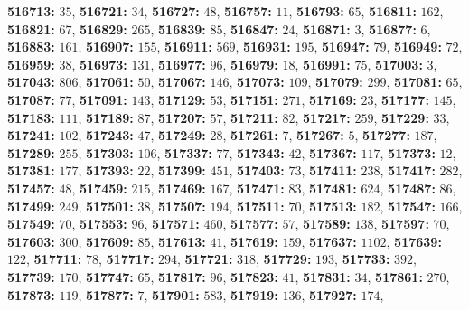 \textsf{\bfseries 516713:} $35$, \textsf{\bfseries 516721:} $34$, \textsf{\bfseries 516727:} $48$, \textsf{\bfseries 516757:} $11$, \textsf{\bfseries 516793:} $65$, \textsf{\bfseries 516811:} $162$, \textsf{\bfseries 516821:} $67$, \textsf{\bfseries 516829:} $265$, \textsf{\bfseries 516839:} $85$, \textsf{\bfseries 516847:} $24$, \textsf{\bfseries 516871:} $3$, \textsf{\bfseries 516877:} $6$, \textsf{\bfseries 516883:} $161$, \textsf{\bfseries 516907:} $155$, \textsf{\bfseries 516911:} $569$, \textsf{\bfseries 516931:} $195$, \textsf{\bfseries 516947:} $79$, \textsf{\bfseries 516949:} $72$, \textsf{\bfseries 516959:} $38$, \textsf{\bfseries 516973:} $131$, \textsf{\bfseries 516977:} $96$, \textsf{\bfseries 516979:} $18$, \textsf{\bfseries 516991:} $75$, \textsf{\bfseries 517003:} $3$, \textsf{\bfseries 517043:} $806$, \textsf{\bfseries 517061:} $50$, \textsf{\bfseries 517067:} $146$, \textsf{\bfseries 517073:} $109$, \textsf{\bfseries 517079:} $299$, \textsf{\bfseries 517081:} $65$, \textsf{\bfseries 517087:} $77$, \textsf{\bfseries 517091:} $143$, \textsf{\bfseries 517129:} $53$, \textsf{\bfseries 517151:} $271$, \textsf{\bfseries 517169:} $23$, \textsf{\bfseries 517177:} $145$, \textsf{\bfseries 517183:} $111$, \textsf{\bfseries 517189:} $87$, \textsf{\bfseries 517207:} $57$, \textsf{\bfseries 517211:} $82$, \textsf{\bfseries 517217:} $259$, \textsf{\bfseries 517229:} $33$, \textsf{\bfseries 517241:} $102$, \textsf{\bfseries 517243:} $47$, \textsf{\bfseries 517249:} $28$, \textsf{\bfseries 517261:} $7$, \textsf{\bfseries 517267:} $5$, \textsf{\bfseries 517277:} $187$, \textsf{\bfseries 517289:} $255$, \textsf{\bfseries 517303:} $106$, \textsf{\bfseries 517337:} $77$, \textsf{\bfseries 517343:} $42$, \textsf{\bfseries 517367:} $117$, \textsf{\bfseries 517373:} $12$, \textsf{\bfseries 517381:} $177$, \textsf{\bfseries 517393:} $22$, \textsf{\bfseries 517399:} $451$, \textsf{\bfseries 517403:} $73$, \textsf{\bfseries 517411:} $238$, \textsf{\bfseries 517417:} $282$, \textsf{\bfseries 517457:} $48$, \textsf{\bfseries 517459:} $215$, \textsf{\bfseries 517469:} $167$, \textsf{\bfseries 517471:} $83$, \textsf{\bfseries 517481:} $624$, \textsf{\bfseries 517487:} $86$, \textsf{\bfseries 517499:} $249$, \textsf{\bfseries 517501:} $38$, \textsf{\bfseries 517507:} $194$, \textsf{\bfseries 517511:} $70$, \textsf{\bfseries 517513:} $182$, \textsf{\bfseries 517547:} $166$, \textsf{\bfseries 517549:} $70$, \textsf{\bfseries 517553:} $96$, \textsf{\bfseries 517571:} $460$, \textsf{\bfseries 517577:} $57$, \textsf{\bfseries 517589:} $138$, \textsf{\bfseries 517597:} $70$, \textsf{\bfseries 517603:} $300$, \textsf{\bfseries 517609:} $85$, \textsf{\bfseries 517613:} $41$, \textsf{\bfseries 517619:} $159$, \textsf{\bfseries 517637:} $1102$, \textsf{\bfseries 517639:} $122$, \textsf{\bfseries 517711:} $78$, \textsf{\bfseries 517717:} $294$, \textsf{\bfseries 517721:} $318$, \textsf{\bfseries 517729:} $193$, \textsf{\bfseries 517733:} $392$, \textsf{\bfseries 517739:} $170$, \textsf{\bfseries 517747:} $65$, \textsf{\bfseries 517817:} $96$, \textsf{\bfseries 517823:} $41$, \textsf{\bfseries 517831:} $34$, \textsf{\bfseries 517861:} $270$, \textsf{\bfseries 517873:} $119$, \textsf{\bfseries 517877:} $7$, \textsf{\bfseries 517901:} $583$, \textsf{\bfseries 517919:} $136$, \textsf{\bfseries 517927:} $174$, 
